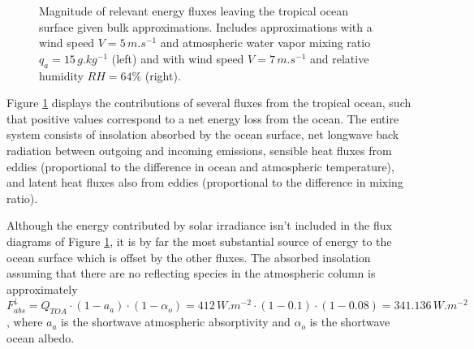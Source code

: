 \documentclass[12pt]{article}
\begin{document}
\begin{figure}[h!]
    \centering
    \caption{Magnitude of relevant energy fluxes leaving the tropical ocean surface given bulk approximations. Includes approximations with a wind speed $V = 5\,\si{m.s^{-1}}$ and atmospheric water vapor mixing ratio $q_a = 15\,\si{g.kg^{-1}}$ (left) and with wind speed $V = 7 \,\si{m.s^{-1}}$ and relative humidity $RH=64\%$ (right).}\label{seaflux}
\end{figure}

Figure \ref{seaflux} displays the contributions of several fluxes from the tropical ocean, such that positive values correspond to a net energy loss from the ocean. The entire system consists of insolation absorbed by the ocean surface, net longwave back radiation between outgoing and incoming emissions, sensible heat fluxes from eddies (proportional to the difference in ocean and atmospheric temperature), and latent heat fluxes also from eddies (proportional to the difference in mixing ratio).

Although the energy contributed by solar irradiance isn't included in the flux diagrams of Figure \ref{seaflux}, it is by far the most substantial source of energy to the ocean surface which is offset by the other fluxes. The absorbed insolation assuming that there are no reflecting species in the atmospheric column is approximately $F^\downarrow_{abs} = Q_{TOA} \cdot (1-a_{a}) \cdot (1-\alpha_o) = 412\,\si{W.m^{-2}} \cdot (1-0.1) \cdot (1-0.08) = 341.136\,\si{W.m^{-2}}$, where $a_a$ is the shortwave atmospheric absorptivity and $\alpha_o$ is the shortwave ocean albedo.
\end{document}
